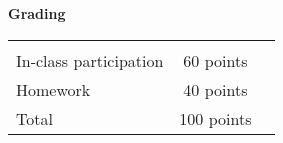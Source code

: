 \documentclass[11pt]{article}
\begin{document}
\begin{large} 
{\raggedright \textbf{Grading}}
\end{large}

\begin{tabular}{lcr}
& & \\ [-12pt]
In-class participation & \hspace{14pt} 60 points\\ 
Homework & \hspace{14pt} 40 points \\
Total & \hspace{14pt} 100 points
\end{tabular}
\end{document}
